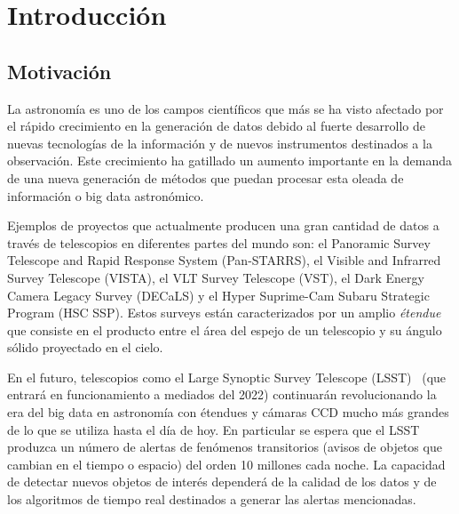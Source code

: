 \chapter{Introducción}
\label{ch:introduction}

\section{Motivaci\'on}
La astronomía es uno de los campos científicos que más se ha visto afectado por el rápido crecimiento en la generación de datos debido al fuerte desarrollo de nuevas tecnologías de la información y  de nuevos instrumentos destinados a la observación. Este crecimiento ha gatillado un aumento importante en la demanda de una nueva generaci\'on de m\'etodos que puedan procesar esta oleada de informaci\'on o big data astron\'omico.
\bigskip

Ejemplos de proyectos que actualmente producen una gran cantidad de datos a trav\'es de telescopios en diferentes partes del mundo son: el Panoramic Survey Telescope and Rapid Response System (Pan-STARRS), el Visible and Infrarred Survey Telescope (VISTA), el VLT Survey Telescope (VST), el Dark Energy Camera Legacy Survey (DECaLS) y el Hyper Suprime-Cam Subaru Strategic Program (HSC SSP). Estos surveys est\'an caracterizados por un amplio \textit{\'etendue}  que consiste en el producto entre el \'area del espejo de un telescopio y su \'angulo s\'olido proyectado en el cielo.
\bigskip

En el futuro, telescopios como el Large Synoptic Survey Telescope (LSST)~\cite{lsst} (que entrará en funcionamiento a mediados del 2022) continuar\'an revolucionando la era del big data en astronom\'ia con \'etendues y c\'amaras CCD mucho m\'as grandes de lo que se utiliza hasta el d\'ia de hoy. En particular se espera que el LSST produzca un n\'umero de alertas de fen\'omenos transitorios (avisos de objetos que cambian en el tiempo o espacio) del orden 10 millones cada noche. La capacidad de detectar nuevos objetos de inter\'es depender\'a de la calidad de los datos y de los algoritmos de tiempo real  destinados a generar las alertas mencionadas. 
\bigskip

